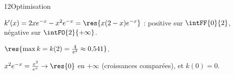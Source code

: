 \begin{corrige}{12}{Optimisation}
\noindent
\begin{minipage}[t]{0.54\linewidth}\vspace{0pt}\raggedright
\begin{questions}
  \item $k'(x)=2xe^{-x}-x^{2}e^{-x}=\res{x(2-x)e^{-x}}$ : positive sur $\intFF{0}{2}$, négative sur $\intFO{2}{+\infty}$.
  \item $\res{\max k=k(2)=\frac{4}{e^{2}}\approx0{,}541}$.
  \item $x^{2}e^{-x}=\frac{x^{2}}{e^{x}}\to\res{0}$ en $+\infty$ (croissances comparées), et $k(0)=0$.
\end{questions}
\end{minipage}\hfill
\begin{minipage}[t]{0.42\linewidth}\vspace{1mm}
\centering
\begin{tableau}
\end{tableau}
\end{minipage}
\end{corrige}

